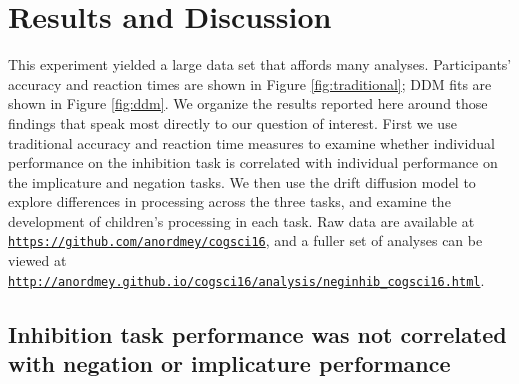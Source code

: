 \documentclass[man, noapacite]{apa2}
\begin{document}

\section{Results and Discussion}

This experiment yielded a large data set that affords many analyses.  Participants' accuracy and reaction times are shown in Figure \ref{fig:traditional}; DDM fits are shown in Figure \ref{fig:ddm}. We organize the results reported here around those findings that speak most directly to our question of interest.  First we use traditional accuracy and reaction time measures to examine whether individual performance on the inhibition task is correlated with individual performance on the implicature and negation tasks. We then use the drift diffusion model to explore differences in processing across the three tasks, and examine the development of children's processing in each task.  Raw data are available at \href{https://github.com/anordmey/cogsci16}{\nolinkurl{https://github.com/anordmey/cogsci16}}, and a fuller set of analyses can be viewed at \href{http://anordmey.github.io/cogsci16/analysis/neginhib_cogsci16.html}{\nolinkurl{http://anordmey.github.io/cogsci16/analysis/neginhib_cogsci16.html}}.


\subsection{Inhibition task performance was not correlated with negation or implicature performance}

\end{document}
